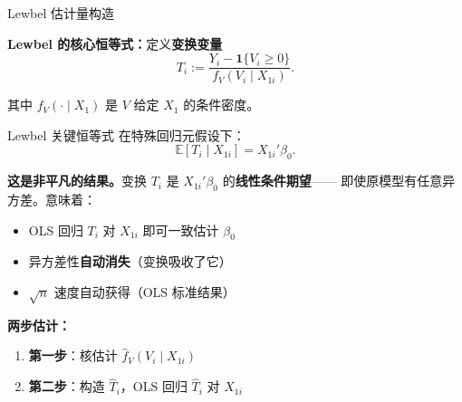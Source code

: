 \documentclass[aspectratio=169, 10pt]{beamer}
\begin{document}
\begin{frame}[shrink=15]{Lewbel 估计量构造}

  \textbf{Lewbel 的核心恒等式：}定义\textbf{变换变量}
  $$T_i := \frac{Y_i - \mathbf{1}\{V_i \geq 0\}}{f_V(V_i \mid X_{1i})}.$$

  其中 $f_V(\cdot \mid X_1)$ 是 $V$ 给定 $X_1$ 的条件密度。

  \begin{definitionbox}{{Lewbel 关键恒等式}}
    在特殊回归元假设下：
    $$\mathbb{E}[T_i \mid X_{1i}] = X_{1i}'\beta_0.$$
  \end{definitionbox}

  \begin{highlightbox}
    \textbf{这是非平凡的结果。}变换 $T_i$ 是 $X_{1i}'\beta_0$ 的\textbf{线性条件期望}——
    即使原模型有任意异方差。意味着：
    \begin{itemize}\setlength{\itemsep}{1pt}
      \item OLS 回归 $T_i$ 对 $X_{1i}$ 即可一致估计 $\beta_0$
      \item 异方差性\textbf{自动消失}（变换吸收了它）
      \item $\sqrt{n}$ 速度自动获得（OLS 标准结果）
    \end{itemize}
  \end{highlightbox}

  \begin{keybox}
    \textbf{两步估计：}
    \begin{enumerate}\setlength{\itemsep}{1pt}
      \item \textbf{第一步}：核估计 $\hat f_V(V_i \mid X_{1i})$
      \item \textbf{第二步}：构造 $\hat T_i$，OLS 回归 $\hat T_i$ 对 $X_{1i}$
    \end{enumerate}
  \end{keybox}

\end{frame}
\end{document}
